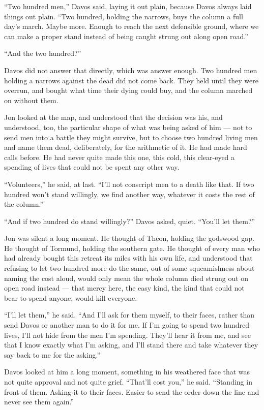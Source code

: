 “Two hundred men,” Davos said, laying it out plain, because Davos always laid things out plain. “Two hundred, holding the narrows, buys the column a full day’s march. Maybe more. Enough to reach the next defensible ground, where we can make a proper stand instead of being caught strung out along open road.”

“And the two hundred?”

Davos did not answer that directly, which was answer enough. Two hundred men holding a narrows against the dead did not come back. They held until they were overrun, and bought what time their dying could buy, and the column marched on without them.

Jon looked at the map, and understood that the decision was his, and understood, too, the particular shape of what was being asked of him — not to send men into a battle they might survive, but to choose two hundred living men and name them dead, deliberately, for the arithmetic of it. He had made hard calls before. He had never quite made this one, this cold, this clear-eyed a spending of lives that could not be spent any other way.

“Volunteers,” he said, at last. “I’ll not conscript men to a death like that. If two hundred won’t stand willingly, we find another way, whatever it costs the rest of the column.”

“And if two hundred do stand willingly?” Davos asked, quiet. “You’ll let them?”

Jon was silent a long moment. He thought of Theon, holding the godswood gap. He thought of Tormund, holding the southern gate. He thought of every man who had already bought this retreat its miles with his own life, and understood that refusing to let two hundred more do the same, out of some squeamishness about naming the cost aloud, would only mean the whole column died strung out on open road instead — that mercy here, the easy kind, the kind that could not bear to spend anyone, would kill everyone.

“I’ll let them,” he said. “And I’ll ask for them myself, to their faces, rather than send Davos or another man to do it for me. If I’m going to spend two hundred lives, I’ll not hide from the men I’m spending. They’ll hear it from me, and see that I know exactly what I’m asking, and I’ll stand there and take whatever they say back to me for the asking.”

Davos looked at him a long moment, something in his weathered face that was not quite approval and not quite grief. “That’ll cost you,” he said. “Standing in front of them. Asking it to their faces. Easier to send the order down the line and never see them again.”

